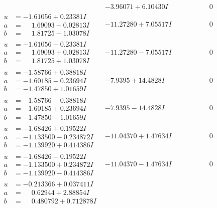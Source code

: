 \documentclass[1p]{elsarticle_modified}
\theoremstyle{definition}
\begin{document}
$$\begin{array}{c|c|c}
 & -3.96071 + 6.10430 I & \phantom{-0.000000 } 0 \\ \hline\begin{aligned}
u &= -1.61056 + 0.23381 I \\
a &= \phantom{-}1.69093 - 0.02813 I \\
b &= \phantom{-}1.81725 - 1.03078 I\end{aligned}
 & -11.27280 + 7.05517 I & \phantom{-0.000000 } 0 \\ \hline\begin{aligned}
u &= -1.61056 - 0.23381 I \\
a &= \phantom{-}1.69093 + 0.02813 I \\
b &= \phantom{-}1.81725 + 1.03078 I\end{aligned}
 & -11.27280 - 7.05517 I & \phantom{-0.000000 } 0 \\ \hline\begin{aligned}
u &= -1.58766 + 0.38818 I \\
a &= -1.60185 - 0.23694 I \\
b &= -1.47850 + 1.01659 I\end{aligned}
 & -7.9395 + 14.4828 I & \phantom{-0.000000 } 0 \\ \hline\begin{aligned}
u &= -1.58766 - 0.38818 I \\
a &= -1.60185 + 0.23694 I \\
b &= -1.47850 - 1.01659 I\end{aligned}
 & -7.9395 - 14.4828 I & \phantom{-0.000000 } 0 \\ \hline\begin{aligned}
u &= -1.68426 + 0.19522 I \\
a &= -1.133500 - 0.234872 I \\
b &= -1.139920 + 0.414386 I\end{aligned}
 & -11.04370 + 1.47634 I & \phantom{-0.000000 } 0 \\ \hline\begin{aligned}
u &= -1.68426 - 0.19522 I \\
a &= -1.133500 + 0.234872 I \\
b &= -1.139920 - 0.414386 I\end{aligned}
 & -11.04370 - 1.47634 I & \phantom{-0.000000 } 0 \\ \hline\begin{aligned}
u &= -0.213366 + 0.037411 I \\
a &= \phantom{-}0.62944 + 2.88854 I \\
b &= \phantom{-}0.480792 + 0.712878 I\end{aligned}

\end{array}$$
\end{document}
